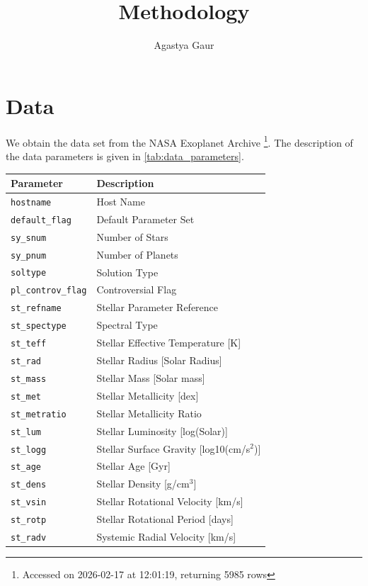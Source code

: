 \documentclass[preprint]{aastex631}
\begin{document}
\title{Methodology}
\author{Agastya Gaur}

\section{Data}

We obtain the data set from the NASA Exoplanet Archive \citep{nasaexoplanetarchivePlanetarySystemsTable2026}\footnote{Accessed on 2026-02-17 at 12:01:19, returning 5985 rows}. The description of the data parameters is given in \autoref{tab:data_parameters}.
\begin{table}
  \centering
  \begin{tabular}{ll}
    \hline
    \textbf{Parameter} & \textbf{Description} \\
    \hline
    \verb|hostname| & Host Name \\
    \verb|default_flag| & Default Parameter Set \\
    \verb|sy_snum| & Number of Stars \\
    \verb|sy_pnum| & Number of Planets \\
    \verb|soltype| & Solution Type \\
    \verb|pl_controv_flag| & Controversial Flag \\
    \verb|st_refname| & Stellar Parameter Reference \\
    \verb|st_spectype| & Spectral Type \\
    \verb|st_teff| & Stellar Effective Temperature [K] \\
    \verb|st_rad| & Stellar Radius [Solar Radius] \\
    \verb|st_mass| & Stellar Mass [Solar mass] \\
    \verb|st_met| & Stellar Metallicity [dex] \\
    \verb|st_metratio| & Stellar Metallicity Ratio \\
    \verb|st_lum| & Stellar Luminosity [log(Solar)] \\
    \verb|st_logg| & Stellar Surface Gravity [log10(cm/s$^2$)] \\
    \verb|st_age| & Stellar Age [Gyr] \\
    \verb|st_dens| & Stellar Density [g/cm$^3$] \\
    \verb|st_vsin| & Stellar Rotational Velocity [km/s] \\
    \verb|st_rotp| & Stellar Rotational Period [days] \\
    \verb|st_radv| & Systemic Radial Velocity [km/s] \\

\end{tabular}
\end{table}
\end{document}
